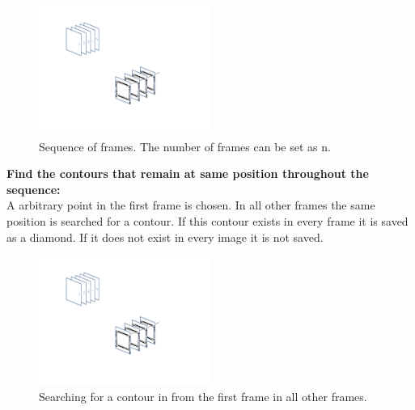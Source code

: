 \begin{figure}[H]
\begin{center}
\leavevmode
\includegraphics[width=0.5\textwidth]{images/image_seq_numbers.pdf}
\end{center}
\caption{Sequence of frames. The number of frames can be set as n.}
\label{fig:seq_img}
\end{figure}

\textbf{Find the contours that remain at same position throughout the sequence:}\\
A arbitrary point in the first frame is chosen. In all other frames the same position is searched for a contour. If this contour exists in every frame it is saved as a diamond. If it does not exist in every image it is not saved.

\begin{figure}[H]
\begin{center}
\leavevmode
\includegraphics[width=0.5\textwidth]{images/image_seq_pool.pdf}
\end{center}
\caption{Searching for a contour in from the first frame in all other frames.}
\label{fig:seq_img_pool}
\end{figure}